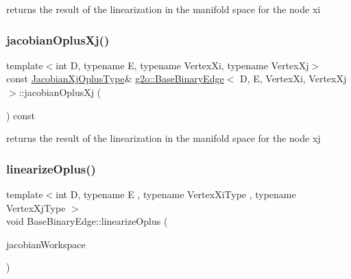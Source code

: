 returns the result of the linearization in the manifold space for the node xi 

\mbox{\label{classg2o_1_1_base_binary_edge_a71c1a583816399cf7db1a91ebe5dbf18}} 
\subsubsection{\texorpdfstring{jacobian\+Oplus\+Xj()}{jacobianOplusXj()}}
{\footnotesize\ttfamily template$<$int D, typename E, typename Vertex\+Xi, typename Vertex\+Xj$>$ \\
const \mbox{\hyperlink{classg2o_1_1_base_binary_edge_a83e5dec2135b33e86255c87be3b5d062}{Jacobian\+Xj\+Oplus\+Type}}\& \mbox{\hyperlink{classg2o_1_1_base_binary_edge}{g2o\+::\+Base\+Binary\+Edge}}$<$ D, E, Vertex\+Xi, Vertex\+Xj $>$\+::jacobian\+Oplus\+Xj (\begin{DoxyParamCaption}{ }\end{DoxyParamCaption}) const\hspace{0.3cm}{\ttfamily [inline]}}



returns the result of the linearization in the manifold space for the node xj 

\mbox{\label{classg2o_1_1_base_binary_edge_afc3b6470e7679f027c2614484b394925}} 
\subsubsection{\texorpdfstring{linearize\+Oplus()}{linearizeOplus()}\hspace{0.1cm}{\footnotesize\ttfamily [1/2]}}
{\footnotesize\ttfamily template$<$int D, typename E , typename Vertex\+Xi\+Type , typename Vertex\+Xj\+Type $>$ \\
void Base\+Binary\+Edge\+::linearize\+Oplus (\begin{DoxyParamCaption}\item[{\mbox{\hyperlink{classg2o_1_1_jacobian_workspace}{Jacobian\+Workspace}} \&}]{jacobian\+Workspace }\end{DoxyParamCaption})\hspace{0.3cm}{\ttfamily [virtual]}}

